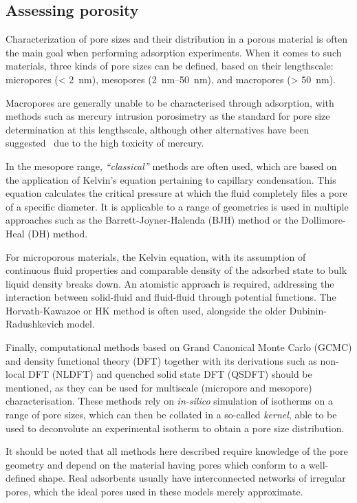 
\subsection{Assessing porosity}

Characterization of pore sizes and their distribution in a porous material
is often the main goal when performing adsorption experiments.
When it comes to such materials, three kinds of pore sizes can be
defined, based on their lengthscale: micropores (\SI{< 2}{\nano\metre}),
mesopores (\SIrange{2}{50}{\nano\metre}), and macropores (\SI{> 50}{\nano\metre}).

Macropores are generally unable to be characterised through adsorption,
with methods such as mercury intrusion porosimetry as the standard for pore
size determination at this lengthscale, although other alternatives have
been suggested~\cite{rouquerolCharacterizationMacroporousSolids2012} due
to the high toxicity of mercury.

In the mesopore range, \textit{``classical''} methods are often
used, which are based on the application of Kelvin's equation
pertaining to capillary condensation. This equation calculates the
critical pressure at which the fluid completely files a pore of a
specific diameter. It is applicable to a range of geometries
is used in multiple approaches such as the Barrett-Joyner-Halenda
(BJH) method or the Dollimore-Heal (DH) method.

For microporous materials, the Kelvin equation, with its assumption
of continuous fluid properties and comparable density of the adsorbed
state to bulk liquid density breaks down. An atomistic approach
is required, addressing the interaction between solid-fluid
and fluid-fluid through potential functions. The Horvath-Kawazoe or
HK method is often used, alongside the older Dubinin-Radushkevich
model.

Finally, computational methods based on Grand Canonical Monte Carlo
(GCMC) and density functional theory (DFT) together with its
derivations such as non-local DFT (NLDFT) and quenched solid state DFT
(QSDFT) should be mentioned, as they can be used for multiscale
(micropore and mesopore) characterisation. These methods rely on
\textit{in-silico} simulation of isotherms on a range of pore sizes,
which can then be collated in a so-called \textit{kernel}, able to
be used to deconvolute an experimental isotherm to obtain a
pore size distribution.

It should be noted that all methods here described require knowledge of
the pore geometry and depend on the material having pores which
conform to a well-defined shape. Real adsorbents usually have
interconnected networks of irregular pores, which the ideal pores
used in these models merely approximate.

